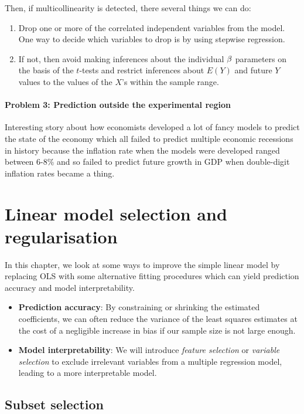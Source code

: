\documentclass{report}
\begin{document}
	Then, if multicollinearity is detected, there several things we can do:
	\begin{enumerate}
		\item Drop one or more of the correlated independent variables from the model. One way to decide which variables to drop is by using stepwise regression.
		\item If not, then avoid making inferences about the individual $\beta$ parameters on the basis of the $t$-tests and restrict inferences about $E(Y)$ and future $Y$ values to the values of the $X$'s within the sample range.
	\end{enumerate}
	
	\subsubsection{Problem 3: Prediction outside the experimental region}
	Interesting story about how economists developed a lot of fancy models to predict the state of the economy which all failed to predict multiple economic recessions in history because the inflation rate when the models were developed ranged between 6-8\% and so failed to predict future growth in GDP when double-digit inflation rates became a thing.
	
	\chapter{Linear model selection and regularisation}
	In this chapter, we look at some ways to improve the simple linear model by replacing OLS with some alternative fitting procedures which can yield prediction accuracy and model interpretability.
	
	\begin{itemize}
		\item \textbf{Prediction accuracy}: By constraining or shrinking the estimated coefficients, we can often reduce the variance of the least squares estimates at the cost of a negligible increase in bias if our sample size is not large enough.
		\item \textbf{Model interpretability}: We will introduce \textit{feature selection} or \textit{variable selection} to exclude irrelevant variables from a multiple regression model, leading to a more interpretable model.
	\end{itemize}
	
	\section{Subset selection}
\end{document}
